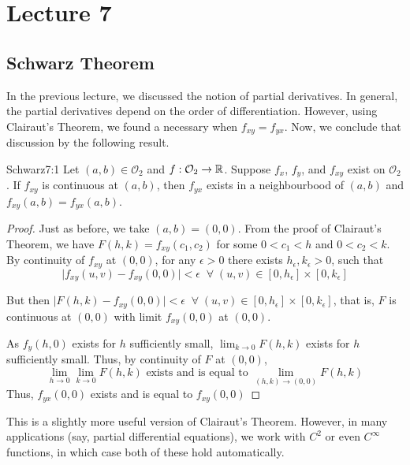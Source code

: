 \documentclass[../Analysis-3.tex]{subfiles}
\begin{document}
\chapter*{Lecture 7} %
\setcounter{chapter}{7} %
\setcounter{section}{0}
\setcounter{equation}{0}
\setcounter{figure}{0}


\section{Schwarz Theorem}

In the previous lecture, we discussed the notion of partial derivatives. In general, the partial derivatives depend on the order of differentiation. However, using Clairaut's Theorem, we found a necessary when $f_{xy} = f_{yx}$. Now, we conclude that discussion by the following result.

\begin{Thm}{Schwarz}{7:1}
  Let $(a,b) \in \mathcal{O}_2$ and $f:\mathcal{O}_2 \to \mathbb{R}$. Suppose $f_x$, $f_y$, and $f_{xy}$ exist on $\mathcal{O}_2$. If $f_{xy}$ is continuous at $(a,b)$, then $f_{yx}$ exists in a neighbourbood of $(a,b)$ and $f_{xy}(a,b) = f_{yx}(a,b)$.
\end{Thm}

\begin{proof}
  Just as before, we take $(a,b) = (0,0)$. From the proof of Clairaut's Theorem, we have $F(h,k) = f_{xy}(c_1, c_2)$ for some $0 < c_1< h$ and $0 < c_2 < k$. By continuity of $f_{xy}$ at $(0,0)$, for any $\epsilon >0$ there exists $h_\epsilon, k_\epsilon > 0$, such that
  \[
    \mid f_{xy}(u,v)- f_{xy}(0,0)\mid < \epsilon \;\;\forall \; (u,v) \in [0,h_\epsilon]\times[0,k_\epsilon]
  \]
  
  But then $\mid F(h,k) - f_{xy}(0,0) \mid < \epsilon \;\;\forall \; (u,v) \in [0,h_\epsilon]\times[0,k_\epsilon]$, that is, $F$ is continuous at $(0,0)$ with limit $f_{xy}(0,0)$ at $(0,0)$.

  As $f_y(h,0)$ exists for $h$ sufficiently small, $\lim_{k \to 0} F(h,k)$ exists for $h$ sufficiently small. Thus, by continuity of $F$ at $(0,0)$,
  \[\lim_{h \to 0}\lim_{k \to 0} F(h,k) \text{  exists and is equal to  }\lim_{(h,k) \to (0,0)} F(h,k)\]
  Thus, $f_{yx}(0,0)$ exists and is equal to $f_{xy}(0,0)$
\end{proof}

\msk

This is a slightly more useful version of Clairaut's Theorem. However, in many applications (say, partial differential equations), we work with $C^2$ or even $C^\infty$ functions, in which case both of these hold automatically.
\end{document}
